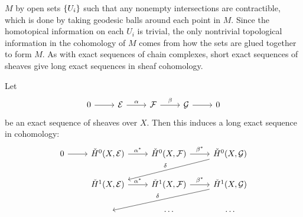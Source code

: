 $M$ by open sets $\left\lbrace U_i \right\rbrace$ such that any nonempty intersections are contractible,
which is done by taking geodesic balls around each point in $M$. Since the
homotopical information on each $U_i$ is trivial, the only nontrivial topological
information in the cohomology of $M$ comes from how the sets are glued together to
form $M$. As with exact sequences of chain complexes, short exact sequences
of sheaves give long exact sequences in sheaf cohomology.
%
\begin{thm}
Let
\[\begin{tikzcd}
0 \ar[r] & \mathcal{E} \ar[r, "\alpha"] & \mathcal{F} \ar[r, "\beta"] & \mathcal{G}
\ar[r] & 0
\end{tikzcd}\]
be an exact sequence of sheaves over $X$. Then this induces a long exact sequence in
cohomology:
\[\begin{tikzcd}
0 \ar[r] & \check{H}^0(X,\mathcal{E}) \ar[r, "\alpha^*"]
& \check{H}^0(X,\mathcal{F}) \ar[r, "\beta^*"] &
\check{H}^0(X, \mathcal{G}) \ar[dll, "\delta"'] \\
& \check{H}^1(X, \mathcal{E}) \ar[r, "\alpha^*"]
& \check{H}^1(X, \mathcal{F})\ar[r, "\beta^*"]
& \check{H}^1(X, \mathcal{G}) \ar[dll, "\delta"'] \\
& ~ & \cdots & \cdots
\end{tikzcd}\]
\end{thm}
%
